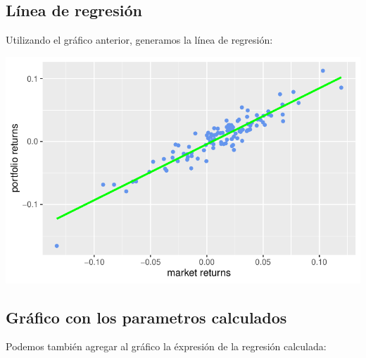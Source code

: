 \documentclass[
  letterpaper,
  DIV=11,
  numbers=noendperiod]{scrartcl}
\newenvironment{Shaded}{\begin{snugshade}}{\end{snugshade}}
\newcommand{\AttributeTok}[1]{\textcolor[rgb]{0.40,0.45,0.13}{#1}}
\newcommand{\ConstantTok}[1]{\textcolor[rgb]{0.56,0.35,0.01}{#1}}
\newcommand{\FunctionTok}[1]{\textcolor[rgb]{0.28,0.35,0.67}{#1}}
\newcommand{\NormalTok}[1]{\textcolor[rgb]{0.00,0.23,0.31}{#1}}
\newcommand{\SpecialCharTok}[1]{\textcolor[rgb]{0.37,0.37,0.37}{#1}}
\newcommand{\StringTok}[1]{\textcolor[rgb]{0.13,0.47,0.30}{#1}}
\begin{document}
\subsection{Línea de regresión}\label{luxednea-de-regresiuxf3n}

Utilizando el gráfico anterior, generamos la línea de regresión:

\begin{Shaded}
\end{Shaded}

\includegraphics[width=0.4\linewidth,height=\textheight,keepaspectratio]{notebook_optimization_test_files/figure-pdf/unnamed-chunk-24-1.pdf}

\subsection{Gráfico con los parametros
calculados}\label{gruxe1fico-con-los-parametros-calculados}

Podemos también agregar al gráfico la éxpresión de la regresión
calculada:
\end{document}
